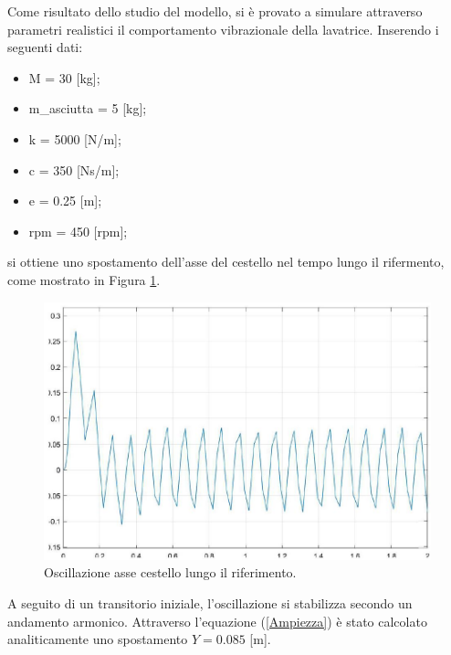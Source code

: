 Come risultato dello studio del modello, si è provato a simulare attraverso parametri realistici il comportamento vibrazionale della lavatrice. Inserendo i seguenti dati:
\begin{itemize}
    \item M = 30 [kg];
    \item m\_asciutta = 5 [kg];
    \item k = 5000 [N/m];
    \item c = 350 [Ns/m];
    \item e = 0.25 [m];
    \item rpm = 450 [rpm];
\end{itemize}
si ottiene uno spostamento dell'asse del cestello nel tempo lungo il rifermento, come mostrato in Figura \ref{PrimoPlot}. 
\begin{figure}[h]
    \centering
    \includegraphics[scale=0.5]{PrimoPlot.JPG}
    \caption{Oscillazione asse cestello lungo il riferimento.}
    \label{PrimoPlot}
\end{figure}
A seguito di un transitorio iniziale, l'oscillazione si stabilizza secondo un andamento armonico.
Attraverso l'equazione (\ref{Ampiezza}) è stato calcolato analiticamente uno spostamento $Y=0.085$ [m].

